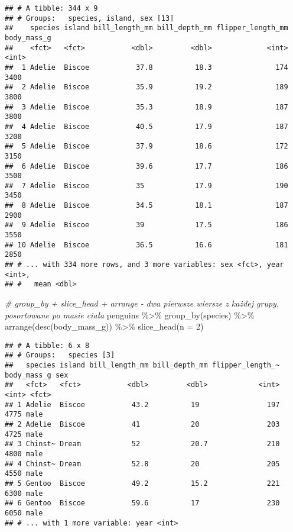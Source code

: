 \documentclass[
]{book}
\newenvironment{Shaded}{\begin{snugshade}}{\end{snugshade}}
\newcommand{\AttributeTok}[1]{\textcolor[rgb]{0.77,0.63,0.00}{#1}}
\newcommand{\CommentTok}[1]{\textcolor[rgb]{0.56,0.35,0.01}{\textit{#1}}}
\newcommand{\DecValTok}[1]{\textcolor[rgb]{0.00,0.00,0.81}{#1}}
\newcommand{\FunctionTok}[1]{\textcolor[rgb]{0.00,0.00,0.00}{#1}}
\newcommand{\NormalTok}[1]{#1}
\newcommand{\SpecialCharTok}[1]{\textcolor[rgb]{0.00,0.00,0.00}{#1}}
\begin{document}
\begin{verbatim}
## # A tibble: 344 x 9
## # Groups:   species, island, sex [13]
##    species island bill_length_mm bill_depth_mm flipper_length_mm body_mass_g
##    <fct>   <fct>           <dbl>         <dbl>             <int>       <int>
##  1 Adelie  Biscoe           37.8          18.3               174        3400
##  2 Adelie  Biscoe           35.9          19.2               189        3800
##  3 Adelie  Biscoe           35.3          18.9               187        3800
##  4 Adelie  Biscoe           40.5          17.9               187        3200
##  5 Adelie  Biscoe           37.9          18.6               172        3150
##  6 Adelie  Biscoe           39.6          17.7               186        3500
##  7 Adelie  Biscoe           35            17.9               190        3450
##  8 Adelie  Biscoe           34.5          18.1               187        2900
##  9 Adelie  Biscoe           39            17.5               186        3550
## 10 Adelie  Biscoe           36.5          16.6               181        2850
## # ... with 334 more rows, and 3 more variables: sex <fct>, year <int>,
## #   mean <dbl>
\end{verbatim}

\begin{Shaded}
\begin{Highlighting}[]
\CommentTok{\# group\_by + slice\_head + arrange {-} dwa pierwsze wiersze z każdej grupy, posortowane po masie ciała}
\NormalTok{penguins }\SpecialCharTok{\%\textgreater{}\%} \FunctionTok{group\_by}\NormalTok{(species) }\SpecialCharTok{\%\textgreater{}\%} \FunctionTok{arrange}\NormalTok{(}\FunctionTok{desc}\NormalTok{(body\_mass\_g)) }\SpecialCharTok{\%\textgreater{}\%} \FunctionTok{slice\_head}\NormalTok{(}\AttributeTok{n =} \DecValTok{2}\NormalTok{)}
\end{Highlighting}
\end{Shaded}

\begin{verbatim}
## # A tibble: 6 x 8
## # Groups:   species [3]
##   species island bill_length_mm bill_depth_mm flipper_length_~ body_mass_g sex  
##   <fct>   <fct>           <dbl>         <dbl>            <int>       <int> <fct>
## 1 Adelie  Biscoe           43.2          19                197        4775 male 
## 2 Adelie  Biscoe           41            20                203        4725 male 
## 3 Chinst~ Dream            52            20.7              210        4800 male 
## 4 Chinst~ Dream            52.8          20                205        4550 male 
## 5 Gentoo  Biscoe           49.2          15.2              221        6300 male 
## 6 Gentoo  Biscoe           59.6          17                230        6050 male 
## # ... with 1 more variable: year <int>
\end{verbatim}
\end{document}
